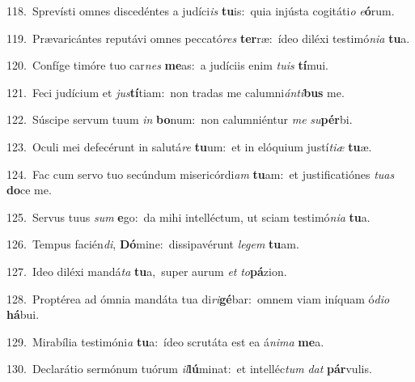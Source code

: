 {\numbfont\textcolor{\numbcolor}{118.}}~Sprevísti omnes discedéntes a judíci\textit{is} \textbf{tu}\-is:~\star quia injústa cogitáti\textit{o} \textit{e}\-\textbf{ó}rum.\par
{\numbfont\textcolor{\numbcolor}{119.}}~Prævaricántes reputávi omnes peccató\textit{res} \textbf{ter}\-ræ:~\star ídeo diléxi testimó\-\textit{ni}\-\textit{a} \textbf{tu}\-a.\par
{\numbfont\textcolor{\numbcolor}{120.}}~Confíge timóre tuo car\textit{nes} \textbf{me}\-as:~\star a judíciis enim \textit{tu}\-\textit{is} \textbf{tí}\-mui.\par
{\numbfont\textcolor{\numbcolor}{121.}}~Feci judícium et \textit{jus}\-\textbf{tí}tiam:~\star non tradas me calumni\-\textit{án}\-\textit{ti}\textbf{bus} me.\par
{\numbfont\textcolor{\numbcolor}{122.}}~Súscipe servum tuum \textit{in} \textbf{bo}\-num:~\star non calumniéntur \textit{me} \textit{su}\-\textbf{pér}bi.\par
{\numbfont\textcolor{\numbcolor}{123.}}~Oculi mei defecérunt in salutá\textit{re} \textbf{tu}\-um:~\star et in elóquium justí\-\textit{ti}\-\textit{æ} \textbf{tu}\-æ.\par
{\numbfont\textcolor{\numbcolor}{124.}}~Fac cum servo tuo secúndum misericórdi\textit{am} \textbf{tu}\-am:~\star et justificatiónes \textit{tu}\-\textit{as} \textbf{do}\-ce me.\par
{\numbfont\textcolor{\numbcolor}{125.}}~Servus tuus \textit{sum} \textbf{e}\-go:~\star da mihi intelléctum, ut sciam testimó\-\textit{ni}\-\textit{a} \textbf{tu}\-a.\par
{\numbfont\textcolor{\numbcolor}{126.}}~Tempus facién\-\textit{di}\-, \textbf{Dó}\-mine:~\star dissipavérunt \textit{le}\-\textit{gem} \textbf{tu}\-am.\par
{\numbfont\textcolor{\numbcolor}{127.}}~Ideo diléxi mandá\textit{ta} \textbf{tu}\-a,~\star super aurum \textit{et} \textit{to}\-\textbf{pá}zion.\par
{\numbfont\textcolor{\numbcolor}{128.}}~Proptérea ad ómnia mandáta tua di\-\textit{ri}\-\textbf{gé}bar:~\star omnem viam iníquam ó\-\textit{di}\-\textit{o} \textbf{há}\-bui.\par
{\numbfont\textcolor{\numbcolor}{129.}}~Mirabília testimóni\textit{a} \textbf{tu}\-a:~\star ídeo scrutáta est ea á\-\textit{ni}\-\textit{ma} \textbf{me}\-a.\par
{\numbfont\textcolor{\numbcolor}{130.}}~Declarátio sermónum tuórum \textit{il}\-\textbf{lú}minat:~\star et intelléc\textit{tum} \textit{dat} \textbf{pár}\-vulis.\par
